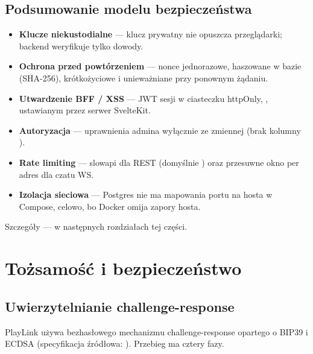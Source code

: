 \section{Podsumowanie modelu bezpieczeństwa}
\label{sec:arch-bezp-podsumowanie}

\begin{itemize}
  \item \textbf{Klucze niekustodialne} --- klucz prywatny nie opuszcza przeglądarki;
        backend weryfikuje tylko dowody.
  \item \textbf{Ochrona przed powtórzeniem} --- nonce jednorazowe, haszowane w bazie
        (SHA-256), krótkożyciowe i unieważniane przy ponownym żądaniu.
  \item \textbf{Utwardzenie BFF / XSS} --- JWT sesji w ciasteczku httpOnly,
        , ustawianym przez serwer SvelteKit.
  \item \textbf{Autoryzacja} --- uprawnienia admina wyłącznie ze zmiennej
         (brak kolumny ).
  \item \textbf{Rate limiting} --- slowapi dla REST (domyślnie ) oraz
        przesuwne okno per adres dla czatu WS.
  \item \textbf{Izolacja sieciowa} --- Postgres nie ma mapowania portu na hosta w Compose,
        celowo, bo Docker omija zapory hosta.
\end{itemize}

Szczegóły --- w następnych rozdziałach tej części.

\chapter{Tożsamość i bezpieczeństwo}
\label{ch:tozsamosc}

\section{Uwierzytelnianie challenge-response}
\label{sec:tozs-flow}

PlayLink używa bezhasłowego mechanizmu challenge-response opartego o BIP39 i ECDSA
(specyfikacja źródłowa: ). Przebieg ma cztery fazy.


